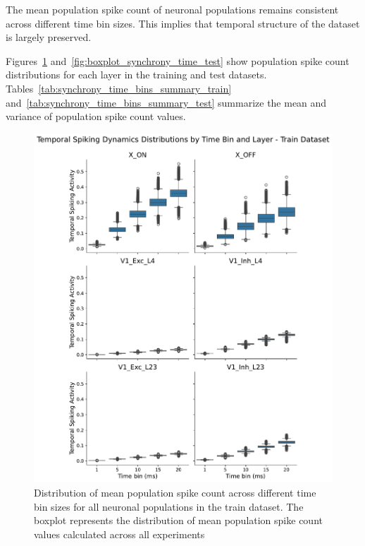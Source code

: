 \begin{claim}
    The mean population spike count of neuronal populations remains consistent across different time bin sizes. This implies that temporal structure of the dataset is largely preserved.
\end{claim}
\label{claim:synchrony_time_bins_size}

Figures~\ref{fig:boxplot_synchrony_time_train} and~\ref{fig:boxplot_synchrony_time_test} show population spike count distributions for each layer in the training and test datasets. Tables~\ref{tab:synchrony_time_bins_summary_train} and~\ref{tab:synchrony_time_bins_summary_test} summarize the mean and variance of population spike count values.

\begin{figure}
    \centering
    \includegraphics[width=0.92\linewidth]{img/plots/synchrony_boxplot_time_bins_train.pdf}
    \caption{Distribution of mean population spike count across different time bin sizes for all neuronal populations in the train dataset. The boxplot represents the distribution of mean population spike count values calculated across all experiments}
    \label{fig:boxplot_synchrony_time_train}
\end{figure}


